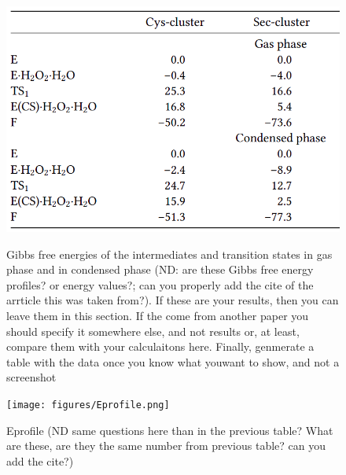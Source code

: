  \begin{figure}
  \caption{Gibbs free energies of the intermediates and transition states in gas phase and in condensed phase (ND: are these Gibbs free energy profiles? or energy values?; can you properly add the cite of the arrticle this was taken from?). If these are your results, then you can leave them in this section. If the come from another paper you should specify it somewhere else, and not results or, at least, compare them with your calculaitons here. Finally, genmerate a table with the data once you know what youwant to show, and not a screenshot}
   \label{fgr:etable}
   \includegraphics[width=\linewidth]{figures/Etable.png} 
 \label{fig:etable}
 \end{figure}

 \begin{figure}
  \caption{Eprofile (ND same questions here than in the previous table? What are these, are they the same number from previous table? can you add the cite?) }
   \label{fgr:eprofile}
   \texttt{[image: figures/Eprofile.png]} 
 \label{fig:eprofile}
 \end{figure}

